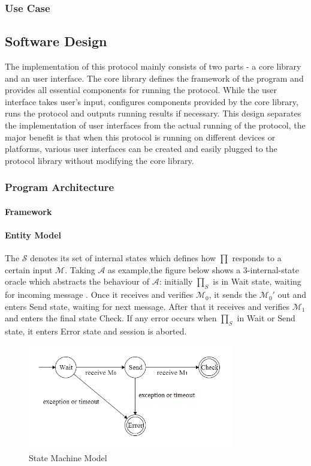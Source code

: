 \subsubsection{Use Case}


\subsection{Software Design}
The implementation of this protocol mainly consists of two parts - a core library and an user interface. The core library defines the framework of the program and provides all essential components for running the protocol. While the user interface takes user's input, configures components provided by the core library, runs the protocol and outputs running results if necessary. This design separates the implementation of user interfaces from the actual running of the protocol, the major benefit is that when this protocol is running on different devices or platforms, various user interfaces can be created and easily plugged to the protocol library without modifying the core library.

\subsubsection{Program Architecture}
\paragraph{Framework}
\paragraph{Entity Model}
The $\mathcal{S}$ denotes its set of internal states which defines how $\prod$ responds to a certain input $\mathcal{M}$. Taking $\mathcal{A}$ as example,the figure below shows a 3-internal-state oracle which abstracts the behaviour of $\mathcal{A}$: initially $\prod_S$ is in Wait state, waiting for incoming message
. Once it receives and verifies $\mathcal{M}_0$, it sends the $\mathcal{M}_0'$ out and enters Send state, waiting for next message. After that it receives and verifies  $\mathcal{M}_1$ and enters the final state Check. If any error occurs when $\prod_S$ in Wait or Send state, it enters Error state and session is aborted.

\begin{figure}[h!]
\centering
\includegraphics[width=0.8\textwidth,natwidth=585,natheight=298]{figures/statemachinefigure.png}
\caption{State Machine Model}
\end{figure}


